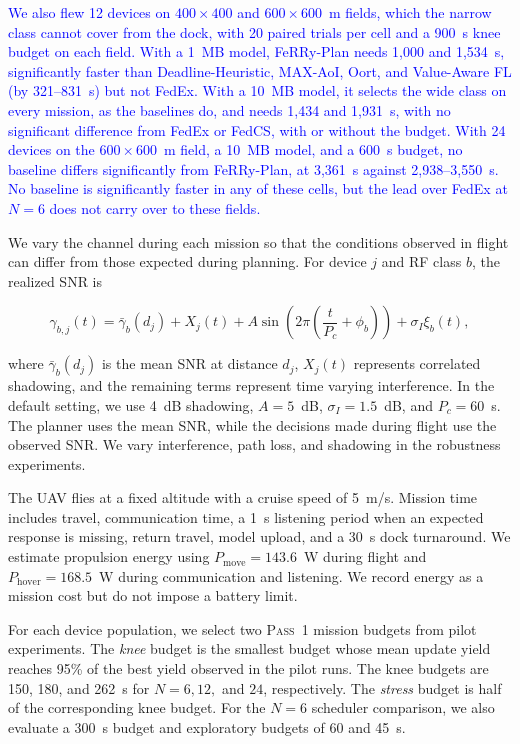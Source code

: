 \documentclass[conference]{IEEEtran}
\newcommand{\sysname}{FeRRy}
\begin{document}
\textcolor{blue}{We also flew 12 devices on \(400\times400\) and \(600\times600\)~m fields, which
the narrow class cannot cover from the dock, with 20 paired trials per cell and a
900~s knee budget on each field. With a 1~MB model, \sysname{}-Plan needs 1,000 and
1,534~s, significantly faster than Deadline-Heuristic, MAX-AoI, Oort, and
Value-Aware FL (by 321--831~s) but not FedEx. With a 10~MB model, it selects the
wide class on every mission, as the baselines do, and needs 1,434 and 1,931~s, with
no significant difference from FedEx or FedCS, with or without the budget. With 24
devices on the \(600\times600\)~m field, a 10~MB model, and a 600~s budget, no
baseline differs significantly from \sysname{}-Plan, at 3,361~s against
2,938--3,550~s. No baseline is significantly faster in any of these cells, but the
lead over FedEx at \(N=6\) does not carry over to these fields.}

We vary the channel during each mission so that the conditions observed in
flight can differ from those expected during planning. For device \(j\) and RF
class \(b\), the realized SNR is

\begin{equation}
\gamma_{b,j}(t)
=
\bar{\gamma}_{b}(d_j)
+
X_j(t)
+
A\sin\!\left(2\pi\left(\frac{t}{P_c}+\phi_b\right)\right)
+
\sigma_I\xi_b(t),
\label{eq:channel-model}
\end{equation}

where \(\bar{\gamma}_{b}(d_j)\) is the mean SNR at distance \(d_j\),
\(X_j(t)\) represents correlated shadowing, and the remaining terms represent
time varying interference. In the default setting, we use 4~dB shadowing,
\(A=5\)~dB, \(\sigma_I=1.5\)~dB, and \(P_c=60\)~s. The planner uses the
mean SNR, while the decisions made during flight use the observed SNR. We vary
interference, path loss, and shadowing in the robustness experiments.

The UAV flies at a fixed altitude with a cruise speed of 5~m/s. Mission time
includes travel, communication time, a 1~s listening period when an expected
response is missing, return travel, model upload, and a 30~s dock turnaround.
We estimate propulsion energy using
\(P_{\mathrm{move}}=143.6\)~W during flight and
\(P_{\mathrm{hover}}=168.5\)~W during communication and listening. We record
energy as a mission cost but do not impose a battery limit.

For each device population, we select two \textsc{Pass~1} mission budgets from
pilot experiments. The \emph{knee} budget is the smallest budget whose mean
update yield reaches 95\% of the best yield observed in the pilot runs. The knee
budgets are 150, 180, and 262~s for \(N=6,12,\) and \(24\), respectively.
The \emph{stress} budget is half of the corresponding knee budget. For the
\(N=6\) scheduler comparison, we also evaluate a 300~s budget and exploratory
budgets of 60 and 45~s.
\end{document}

